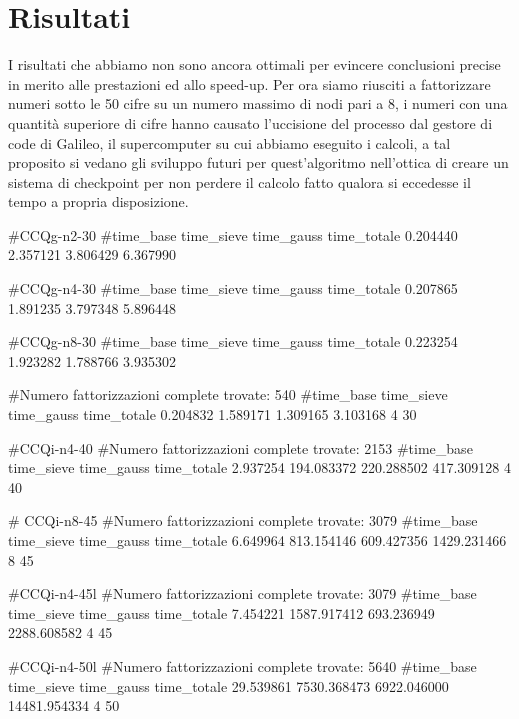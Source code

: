 \section{Risultati}
\label{sec:risultati}


I risultati che abbiamo non sono ancora ottimali per evincere conclusioni precise in merito alle prestazioni ed allo speed-up.
Per ora siamo riusciti a fattorizzare numeri sotto le 50 cifre su un numero massimo di nodi pari a 8, i numeri con una quantità superiore di cifre hanno causato l'uccisione del processo dal gestore di code di Galileo, il supercomputer su cui abbiamo eseguito i calcoli, a tal proposito si vedano gli sviluppo futuri per quest'algoritmo nell'ottica di creare un sistema di checkpoint per non perdere il calcolo fatto qualora si eccedesse il tempo a propria disposizione. \\



\begin{}
#CCQg-n2-30
#time_base time_sieve time_gauss time_totale
0.204440 2.357121 3.806429 6.367990  

#CCQg-n4-30
#time_base time_sieve time_gauss time_totale
0.207865 1.891235 3.797348 5.896448 

#CCQg-n8-30
#time_base time_sieve time_gauss time_totale
0.223254 1.923282 1.788766 3.935302 
\end{}














#Numero fattorizzazioni complete trovate: 540
#time_base time_sieve time_gauss time_totale
0.204832 1.589171 1.309165 3.103168 4 30

#CCQi-n4-40
#Numero fattorizzazioni complete trovate: 2153
#time_base time_sieve time_gauss time_totale
2.937254 194.083372 220.288502 417.309128 4 40

# CCQi-n8-45
#Numero fattorizzazioni complete trovate: 3079
#time_base time_sieve time_gauss time_totale
6.649964 813.154146 609.427356 1429.231466 8 45

#CCQi-n4-45l
#Numero fattorizzazioni complete trovate: 3079
#time_base time_sieve time_gauss time_totale
7.454221 1587.917412 693.236949 2288.608582 4 45

#CCQi-n4-50l
#Numero fattorizzazioni complete trovate: 5640
#time_base time_sieve time_gauss time_totale
29.539861 7530.368473 6922.046000 14481.954334 4 50

